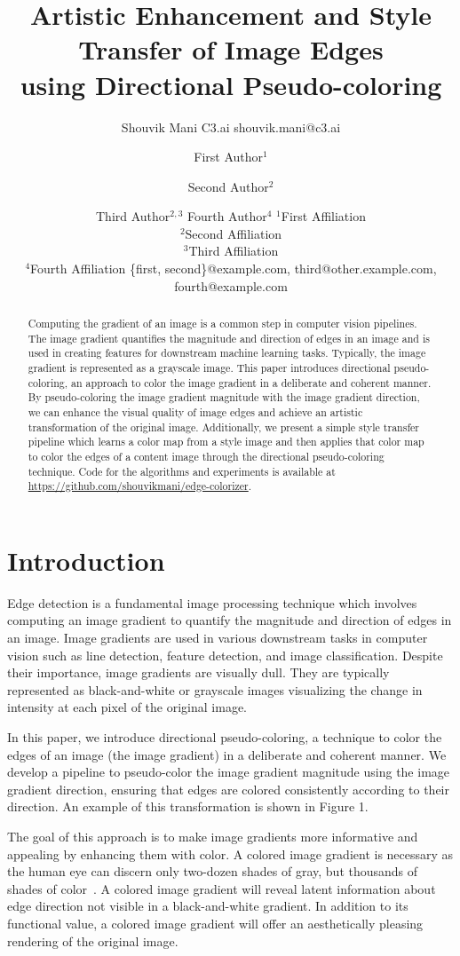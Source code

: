 \documentclass{article}
\title{Artistic Enhancement and Style Transfer of Image Edges\\ using Directional Pseudo-coloring}
\author{
    Shouvik Mani
    \affiliations
    C3.ai \emails
    shouvik.mani@c3.ai
}
\author{
First Author$^1$
\and
Second Author$^2$\and
Third Author$^{2,3}$\And
Fourth Author$^4$
\affiliations
$^1$First Affiliation\\
$^2$Second Affiliation\\
$^3$Third Affiliation\\
$^4$Fourth Affiliation
\emails
\{first, second\}@example.com,
third@other.example.com,
fourth@example.com
}
\begin{document}
\maketitle

\begin{abstract}
Computing the gradient of an image is a common step in computer vision pipelines. The image gradient quantifies the magnitude and direction of edges in an image and is used in creating features for downstream machine learning tasks. Typically, the image gradient is represented as a grayscale image. This paper introduces directional pseudo-coloring, an approach to color the image gradient in a deliberate and coherent manner. By pseudo-coloring the image gradient magnitude with the image gradient direction, we can enhance the visual quality of image edges and achieve an artistic transformation of the original image. Additionally, we present a simple style transfer pipeline which learns a color map from a style image and then applies that color map to color the edges of a content image through the directional pseudo-coloring technique. Code for the algorithms and experiments is available at \url{https://github.com/shouvikmani/edge-colorizer}.
\end{abstract}

\section{Introduction}

Edge detection is a fundamental image processing technique which involves computing an image gradient to quantify the magnitude and direction of edges in an image. Image gradients are used in various downstream tasks in computer vision such as line detection, feature detection, and image classification. Despite their importance, image gradients are visually dull. They are typically represented as black-and-white or grayscale images visualizing the change in intensity at each pixel of the original image.

In this paper, we introduce directional pseudo-coloring, a technique to color the edges of an image (the image gradient) in a deliberate and coherent manner. We develop a pipeline to pseudo-color the image gradient magnitude using the image gradient direction, ensuring that edges are colored consistently according to their direction. An example of this transformation is shown in Figure 1.

The goal of this approach is to make image gradients more informative and appealing by enhancing them with color. A colored image gradient is necessary as the human eye can discern only two-dozen shades of gray, but thousands of shades of color~\cite{human_machine}. A colored image gradient will reveal latent information about edge direction not visible in a black-and-white gradient. In addition to its functional value, a colored image gradient will offer an aesthetically pleasing rendering of the original image.
\end{document}
